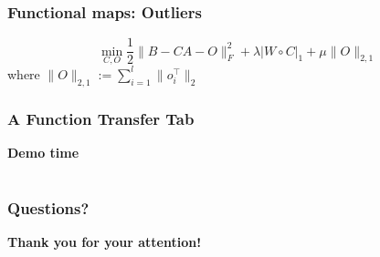 \documentclass[compress]{beamer}
\begin{document}
\begin{frame}[fragile]
\begin{figure}[htp]
\begin{center}
  \end{center}
\end{figure}
\end{frame}

\begin{frame}[fragile]
\frametitle{Functional maps: Outliers}
$$
	\min_{C,O} \frac{1}{2} \| B - CA -O \|_F^2 + \lambda |W \circ C|_1 + \mu \|O\|_{2,1}
$$
where $\|O\|_{2,1}:= \sum_{i=1}^l \|o_i^\top \|_2$
\end{frame}

\begin{frame}[fragile]
\frametitle{A Function Transfer Tab}
\bf{Demo time}
\end{frame}

\section*{}

\begin{frame}
\frametitle{Questions?}
\bf{Thank you for your attention!}
\end{frame}
\end{document}
